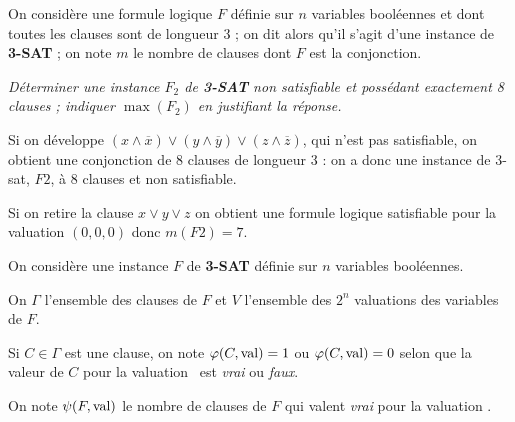 On considère une formule logique $F$ définie sur $n$ variables booléennes et dont toutes les clauses sont de longueur 3 ; on dit alors qu’il s’agit d’une instance de {\bf 3-SAT} ; on note $m$ le nombre de clauses dont $F$ est la conjonction.
\begin{Exercise}\it
Déterminer une instance $F_2$ de {\bf 3-SAT} non satisfiable et possédant exactement 8 clauses ; indiquer $\max(F_2)$ en justifiant la réponse.
\end{Exercise}
\begin{Answer}

Si on développe $(x\land \overline x) \lor (y\land \overline y) \lor (z\land \overline z)$, qui n'est pas satisfiable, on obtient une conjonction de 8 clauses de longueur 3 : on a donc une instance de 3-sat, $F2$, à 8 clauses et non satisfiable.

Si on retire la clause $x \lor y \lor z$ on obtient une formule logique satisfiable pour la valuation $(0,0,0)$ donc $m(F2)=7$.

\end{Answer}
On considère une instance $F$ de {\bf 3-SAT} définie sur $n$ variables booléennes. 

On $\Gamma$ l'ensemble des clauses de $F$ et $V$ l’ensemble des $2^n$ valuations des variables de $F$. 

Si $C\in\Gamma$ est une clause, on note $\varphi ( C , \text{\rm val} )=1$ ou $\varphi ( C , \text{\rm val} )=0$ selon que la valeur de $C$ pour la valuation \val\ est {\it vrai} ou {\it faux}. 

On note $\psi ( F , \text{\rm val})$ le nombre de clauses de $F$ qui valent {\it vrai} pour la valuation \val. 

